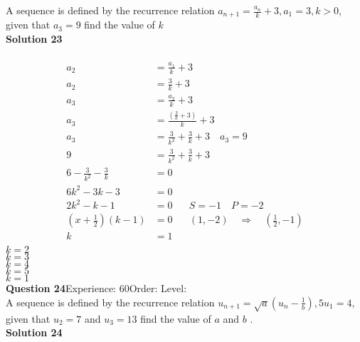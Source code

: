 \documentclass{article}
\begin{document}
A sequence is defined by the recurrence relation $a_{n+1}=\displaystyle\frac{a_n}{k}+3, a_1=3,k>0$, given that $a_3=9$ find the value of $k$\\[4pt]
\noindent\textbf{Solution 23}\\[2pt]
\\[-10pt]\begin{align*}
a_2&=\displaystyle\frac{a_1}{k}+3\\[2pt]
a_2&=\displaystyle\frac{3}{k}+3\\[12pt]
a_3&=\displaystyle\frac{a_2}{k}+3\\[2pt]
a_3&=\displaystyle\frac{\left(\displaystyle\frac{3}{k}+3\right)}{k}+3\\[2pt]
a_3&=\displaystyle\frac{3}{k^2}+\frac{3}{k}+3\quad a_3=9\\[12pt]
9&=\displaystyle\frac{3}{k^2}+\frac{3}{k}+3\\[2pt]
6-\displaystyle\frac{3}{k^2}-\frac{3}{k}&=0\\[2pt]
6k^2-3k-3&=0\\[2pt]
2k^2-k-1&=0\hspace{20pt}S=-1\quad P=-2\\[2pt]
\left(x+\displaystyle\frac{1}{2}\right)(k-1)&=0\hspace{20pt} (1,-2) \quad \Rightarrow \quad \left(\displaystyle\frac{1}{2},-1\right)\\[2pt]
k&=1\\
\end{align*}
$k=2$\\
$k=3$\\
$k=4$\\
$k=5$\\
$k=1$\\
\noindent\textbf{Question 24}\hspace{20pt}Experience: 60\hspace{20pt}Order: \hspace{20pt}Level: \\[2pt]
A sequence is defined by the recurrence relation $u_{n+1}=\sqrt{a}\left(u_n-\displaystyle\frac{1}{b}\right),5 u_1=4$, given that $u_2=7$ and $u_3=13$ find the value of $a$ and $b$ .\\[4pt]
\noindent\textbf{Solution 24}\\[2pt]
\end{document}
